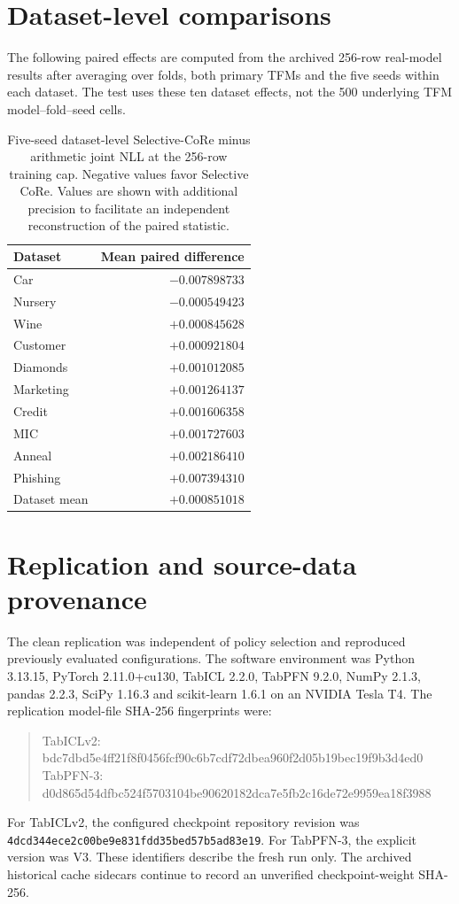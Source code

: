 \documentclass[a4paper,fleqn]{cas-sc}
\begin{document}
\section{Dataset-level comparisons}
The following paired effects are computed from the archived 256-row real-model results after averaging over folds, both primary TFMs and the five seeds within each dataset. The test uses these ten dataset effects, not the 500 underlying TFM model--fold--seed cells.
\begin{table}
\centering
\caption{Five-seed dataset-level Selective-CoRe minus arithmetic joint NLL at the 256-row training cap. Negative values favor Selective CoRe. Values are shown with additional precision to facilitate an independent reconstruction of the paired statistic.}
\label{tab:datasetprimary}
\begin{tabular}{lr}
\toprule
Dataset & Mean paired difference\\
\midrule
Car & $-0.007898733$\\
Nursery & $-0.000549423$\\
Wine & $+0.000845628$\\
Customer & $+0.000921804$\\
Diamonds & $+0.001012085$\\
Marketing & $+0.001264137$\\
Credit & $+0.001606358$\\
MIC & $+0.001727603$\\
Anneal & $+0.002186410$\\
Phishing & $+0.007394310$\\
\midrule
Dataset mean & $+0.000851018$\\
\bottomrule
\end{tabular}
\end{table}

\section{Replication and source-data provenance}
The clean replication was independent of policy selection and reproduced previously evaluated configurations. The software environment was Python 3.13.15, PyTorch 2.11.0+cu130, TabICL 2.2.0, TabPFN 9.2.0, NumPy 2.1.3, pandas 2.2.3, SciPy 1.16.3 and scikit-learn 1.6.1 on an NVIDIA Tesla T4. The replication model-file SHA-256 fingerprints were:
\begin{quote}\small\ttfamily
TabICLv2: bdc7dbd5e4ff21f8f0456fcf90c6b7cdf72dbea960f2d05b19bec19f9b3d4ed0\\
TabPFN-3: d0d865d54dfbc524f5703104be90620182dca7e5fb2c16de72e9959ea18f3988
\end{quote}
For TabICLv2, the configured checkpoint repository revision was \texttt{4dcd344ece2c00be9e831fdd35bed57b5ad83e19}. For TabPFN-3, the explicit version was V3. These identifiers describe the fresh run only. The archived historical cache sidecars continue to record an unverified checkpoint-weight SHA-256.
\end{document}
